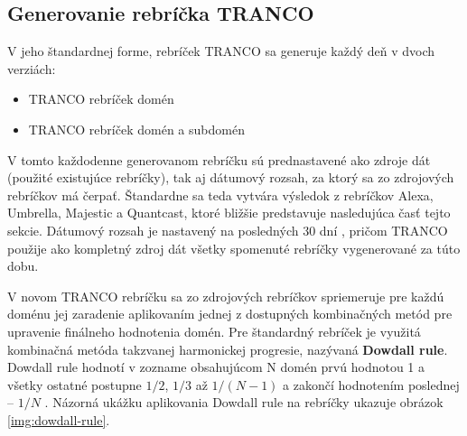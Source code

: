 \subsection{Generovanie rebríčka TRANCO}
\label{tranco-generation}

V jeho štandardnej forme, rebríček TRANCO sa generuje každý deň v dvoch verziách:
\begin{itemize}
    \item TRANCO rebríček domén
    \item TRANCO rebríček domén a subdomén
\end{itemize}

\pagebreak

V tomto každodenne generovanom rebríčku sú prednastavené ako zdroje dát (použité existujúce rebríčky), tak aj dátumový rozsah, za ktorý sa zo zdrojových rebríčkov má čerpať.
Štandardne sa teda vytvára výsledok z rebríčkov Alexa, Umbrella, Majestic a Quantcast, ktoré bližšie predstavuje nasledujúca časť tejto sekcie. 
Dátumový rozsah je nastavený na posledných 30 dní \cite{tranco-github}, pričom TRANCO použije ako kompletný zdroj dát všetky spomenuté rebríčky vygenerované za túto dobu. 

V novom TRANCO rebríčku sa zo zdrojových rebríčkov spriemeruje pre každú doménu jej zaradenie aplikovaním jednej z dostupných kombinačných metód pre upravenie finálneho hodnotenia domén.
Pre štandardný rebríček je využitá kombinačná metóda takzvanej harmonickej progresie, nazývaná \textbf{Dowdall rule}. 
Dowdall rule hodnotí v zozname obsahujúcom N domén prvú hodnotou 1 a všetky ostatné postupne \(1/2\), \(1/3\) až \(1/(N-1)\) a zakončí hodnotením poslednej -- \(1/N\) \cite{tranco, tranco-homepage}.
Názorná ukážku aplikovania Dowdall rule na rebríčky ukazuje obrázok \ref{img:dowdall-rule}.

